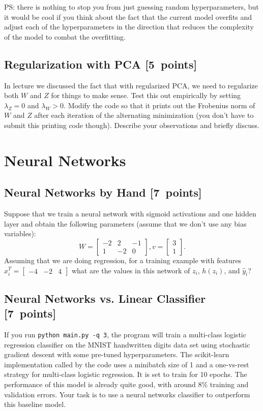 \documentclass{article}
\newcommand{\blu}[1]{{\textcolor{blu}{#1}}}
\let\ask\blu
\newcommand\pts[1]{\textcolor{pointscolour}{[#1~points]}}
\newcommand{\mat}[1]{\begin{bmatrix}#1\end{bmatrix}}
\begin{document}
PS: there is nothing to stop you from just guessing random hyperparameters, but it would be cool if you think about the fact that the current model overfits and adjust each of the hyperparameters in the direction that reduces the complexity of the model to combat the overfitting.


\subsection{Regularization with PCA \pts{5}}

In lecture we discussed the fact that with regularized PCA, we need to regularize both $W$ and $Z$ for things to make sense. Test this out empirically by setting $\lambda_Z=0$ and $\lambda_W>0$. Modify the code so that it prints out the Frobenius norm of $W$ and $Z$ after each iteration of the alternating minimization (you don't have to submit this printing code though). \ask{Describe your observations and briefly discuss.}


\section{Neural Networks}

\subsection{Neural Networks by Hand \pts{7}}

Suppose that we train a neural network with sigmoid activations and one hidden layer and obtain the following parameters (assume that we don't use any bias variables):
\[
W = \mat{-2 & 2 & -1\\1 & -2 & 0}, v = \mat{3 \\1}.
\]
Assuming that we are doing regression, \ask{for a training example with features $x_i^T = \mat{-4 &-2 & 4}$ what are the values in this network of $z_i$, $h(z_i)$, and $\hat{y}_i$?}

\subsection{Neural Networks vs. Linear Classifier \pts{7}}


If you run \texttt{python main.py -q 3}, the program will train a multi-class logistic regression classifier on the MNIST handwritten digits data set using stochastic gradient descent with some pre-tuned hyperparameters.
The scikit-learn implementation called by the code uses a minibatch size of 1 and a one-vs-rest strategy for multi-class logistic regression. It is set to train for 10 epochs.
The performance of this model is already quite good, with around 8\% training and validation errors. Your task is to use a neural networks classifier to outperform this baseline model.
\end{document}
